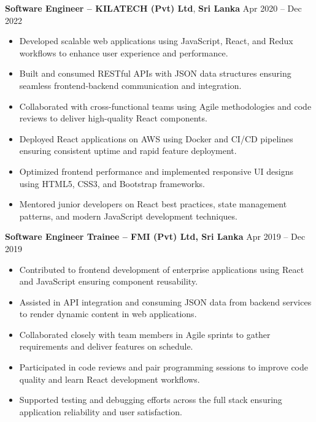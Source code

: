 \documentclass[10pt,letterpaper]{article}
\begin{document}
\vspace{-2pt}

\textbf{Software Engineer -- KILATECH (Pvt) Ltd}, \textbf{Sri Lanka} \hfill Apr 2020 -- Dec 2022

\vspace{-1pt}

\begin{itemize}
\item Developed scalable web applications using JavaScript, React, and Redux workflows to enhance user experience and performance.
\item Built and consumed RESTful APIs with JSON data structures ensuring seamless frontend-backend communication and integration.
\item Collaborated with cross-functional teams using Agile methodologies and code reviews to deliver high-quality React components.
\item Deployed React applications on AWS using Docker and CI/CD pipelines ensuring consistent uptime and rapid feature deployment.
\item Optimized frontend performance and implemented responsive UI designs using HTML5, CSS3, and Bootstrap frameworks.
\item Mentored junior developers on React best practices, state management patterns, and modern JavaScript development techniques.
\end{itemize}

\textbf{Software Engineer Trainee -- FMI (Pvt) Ltd, Sri Lanka} \hfill Apr 2019 -- Dec 2019

\vspace{-1pt}

\begin{itemize}
\item Contributed to frontend development of enterprise applications using React and JavaScript ensuring component reusability.
\item Assisted in API integration and consuming JSON data from backend services to render dynamic content in web applications.
\item Collaborated closely with team members in Agile sprints to gather requirements and deliver features on schedule.
\item Participated in code reviews and pair programming sessions to improve code quality and learn React development workflows.
\item Supported testing and debugging efforts across the full stack ensuring application reliability and user satisfaction.
\end{itemize}
\end{document}
